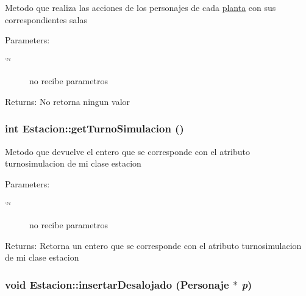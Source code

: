 Metodo que realiza las acciones de los personajes de cada \hyperlink{classplanta}{planta} con sus correspondientes salas \begin{Desc}
\item[Parameters:]
\begin{description}
\item[{\em \char`\"{}\char`\"{}}]no recibe parametros \end{description}
\end{Desc}
\begin{Desc}
\item[Returns:]No retorna ningun valor \end{Desc}
\hypertarget{classEstacion_e33e40e284a7e35858fef85ab1c13b19}{
\subsubsection[getTurnoSimulacion]{\setlength{\rightskip}{0pt plus 5cm}int Estacion::getTurnoSimulacion ()}}
\label{classEstacion_e33e40e284a7e35858fef85ab1c13b19}


Metodo que devuelve el entero que se corresponde con el atributo turnosimulacion de mi clase estacion \begin{Desc}
\item[Parameters:]
\begin{description}
\item[{\em \char`\"{}\char`\"{}}]no recibe parametros \end{description}
\end{Desc}
\begin{Desc}
\item[Returns:]Retorna un entero que se corresponde con el atributo turnosimulacion de mi clase estacion \end{Desc}
\hypertarget{classEstacion_b130dedc0129c5a913415d3bacebd529}{
\subsubsection[insertarDesalojado]{\setlength{\rightskip}{0pt plus 5cm}void Estacion::insertarDesalojado ({\bf Personaje} $\ast$ {\em p})}}
\label{classEstacion_b130dedc0129c5a913415d3bacebd529}



